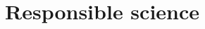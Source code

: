 \documentclass[a4paper,12pt]{article}
\begin{document}
%
%
\section{Responsible science}
\end{document}
